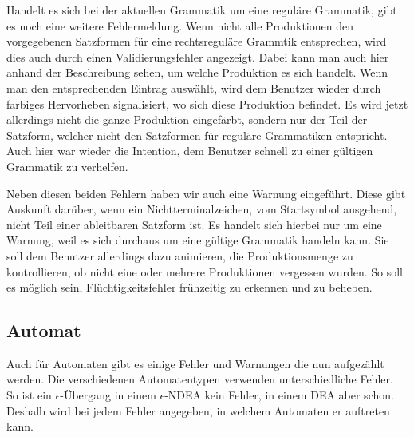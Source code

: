 Handelt es sich bei der aktuellen Grammatik um eine reguläre Grammatik, gibt es
noch eine weitere Fehlermeldung. Wenn nicht alle Produktionen den vorgegebenen
Satzformen für eine rechtsreguläre Grammtik entsprechen, wird dies auch durch
einen Validierungsfehler angezeigt. Dabei kann man auch hier anhand der
Beschreibung sehen, um welche Produktion es sich handelt. Wenn man den
entsprechenden Eintrag auswählt, wird dem Benutzer wieder durch farbiges
Hervorheben signalisiert, wo sich diese Produktion befindet. Es wird jetzt
allerdings nicht die ganze Produktion eingefärbt, sondern nur der Teil der
Satzform, welcher nicht den Satzformen für reguläre Grammatiken entspricht. Auch
hier war wieder die Intention, dem Benutzer schnell zu einer gültigen Grammatik
zu verhelfen.\vspace{10pt}

Neben diesen beiden Fehlern haben wir auch eine Warnung eingeführt. Diese gibt
Auskunft darüber, wenn ein Nichtterminalzeichen, vom Startsymbol ausgehend, nicht
Teil einer ableitbaren Satzform ist. Es handelt sich hierbei nur um eine Warnung,
weil es sich durchaus um eine gültige Grammatik handeln kann. Sie soll dem
Benutzer allerdings dazu animieren, die Produktionsmenge zu kontrollieren, ob
nicht eine oder mehrere Produktionen vergessen wurden. So soll es möglich sein,
Flüchtig\-keits\-fehler frühzeitig zu erkennen und zu beheben.\vspace{10pt}

\subsection{Automat}\label{InteractionMachine}

Auch für Automaten gibt es einige Fehler und Warnungen die nun aufgezählt
werden. Die verschiedenen Automatentypen verwenden unterschiedliche Fehler. So
ist ein $\epsilon$-Übergang in einem $\epsilon$-NDEA kein Fehler, in einem DEA
aber schon. Deshalb wird bei jedem Fehler angegeben, in welchem Automaten er
auftreten kann.\vspace{10pt}

